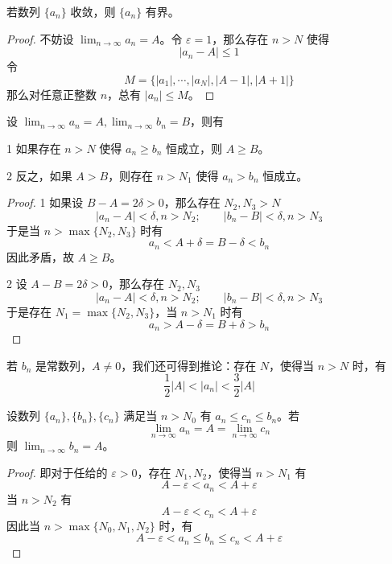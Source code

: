 \begin{theorem}[有界性]
	若数列 $\{a_n\}$ 收敛，则 $\{a_n\}$ 有界。
\end{theorem}

\begin{proof}
	不妨设 $\displaystyle\lim_{n\to \infty} a_n = A$。令 $\varepsilon = 1$，那么存在 $n>N$ 使得
	$$|a_n-A| \leqslant 1$$
	令
	$$M = \{|a_1|,\cdots,|a_N|,|A-1|,|A+1|\}$$
	那么对任意正整数 $n$，总有 $|a_n|\leqslant M$。
\end{proof}

\begin{theorem}
	设 $\displaystyle\lim_{n\to \infty} a_n = A,\displaystyle\lim_{n\to \infty} b_n = B$，则有

	\num{1} 如果存在 $n>N$ 使得 $a_n\geqslant b_n$ 恒成立，则 $A\geqslant B$。

	\num{2} 反之，如果 $A>B$，则存在 $n>N_1$ 使得 $a_n>b_n$ 恒成立。
\end{theorem}
\begin{proof}
	\num{1} 如果设 $B-A=2\delta>0$，那么存在 $N_2,N_3>N$
	$$|a_n-A|<\delta,n>N_2;\qquad |b_n-B|<\delta,n>N_3$$
	于是当 $n>\max\{N_2,N_3\}$ 时有
	$$a_n<A+\delta=B-\delta<b_n$$
	因此矛盾，故 $A\geqslant B$。

	\num{2} 设 $A-B=2\delta>0$，那么存在 $N_2,N_3$
	$$|a_n-A|<\delta,n>N_2;\qquad |b_n-B|<\delta,n>N_3$$
	于是存在 $N_1=\max\{N_2,N_3\}$，当 $n>N_1$ 时有
	$$a_n>A-\delta=B+\delta>b_n$$
\end{proof}

若 $b_n$ 是常数列，$A\ne 0$，我们还可得到推论：存在 $N$，使得当 $n>N$ 时，有
$$\frac{1}{2}|A| < |a_n| < \frac{3}{2}|A|$$

\begin{theorem}
	设数列 $\{a_n\},\{b_n\},\{c_n\}$ 满足当 $n>N_0$ 有 $a_n\leqslant c_n\leqslant b_n$。若
	$$\lim_{n\to \infty}a_n = A = \lim_{n\to \infty}c_n$$
	则 $\displaystyle\lim_{n\to \infty}b_n = A$。
\end{theorem}
\begin{proof}
	即对于任给的 $\varepsilon>0$，存在 $N_1,N_2$，使得当 $n>N_1$ 有 
	$$A-\varepsilon<a_n<A+\varepsilon$$
	当 $n>N_2$ 有 
	$$A-\varepsilon<c_n<A+\varepsilon$$
	因此当 $n>\max\{N_0,N_1,N_2\}$ 时，有
	$$A-\varepsilon < a_n \leqslant b_n \leqslant c_n < A+\varepsilon$$
\end{proof}

